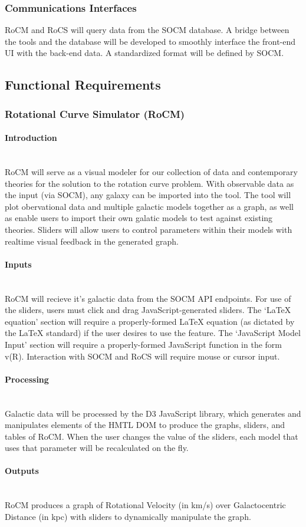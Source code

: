 \documentclass[titlepage]{article}
\newcommand{\myparagraph}[1]{\paragraph{#1}\mbox{}\\}
\begin{document}
\subsubsection{Communications Interfaces}
RoCM and RoCS will query data from the SOCM database. A bridge between the tools and the database will be developed to smoothly interface the front-end UI with the back-end data. A standardized format will be defined by SOCM.

\subsection{Functional Requirements}
\subsubsection{Rotational Curve Simulator (RoCM)}

\myparagraph{Introduction}
RoCM will serve as a visual modeler for our collection of data and contemporary theories for the solution to the rotation curve problem. With observable data as the input (via SOCM), any galaxy can be imported into the tool. The tool will plot obervational data and multiple galactic models together as a graph, as well as enable users to import their own galatic models to test against existing theories. Sliders will allow users to control parameters within their models with realtime visual feedback in the generated graph.

\myparagraph{Inputs}
RoCM will recieve it's galactic data from the SOCM API endpoints. For use of the sliders, users must click and drag JavaScript-generated sliders. The `LaTeX equation' section will require a properly-formed LaTeX equation (as dictated by the LaTeX standard) if the user desires to use the feature. The `JavaScript Model Input' section will require a properly-formed JavaScript function in the form v(R). Interaction with SOCM and RoCS will require mouse or cursor input.

\myparagraph{Processing}
Galactic data will be processed by the D3 JavaScript library, which generates and manipulates elements of the HMTL DOM to produce the graphs, sliders, and tables of RoCM. When the user changes the value of the sliders, each model that uses that parameter will be recalculated on the fly.

\myparagraph{Outputs}
RoCM produces a graph of Rotational Velocity (in km/s) over Galactocentric Distance (in kpc) with sliders to dynamically manipulate the graph.
\end{document}
